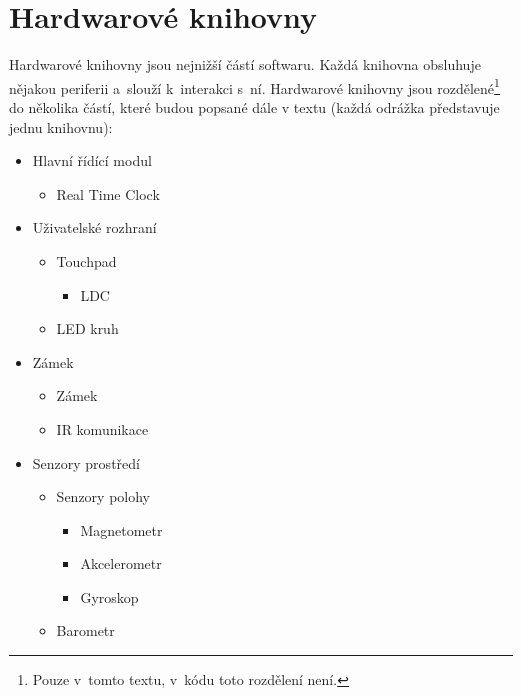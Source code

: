 \chapter{Hardwarové knihovny}
Hardwarové knihovny jsou nejnižší částí softwaru.
Každá knihovna obsluhuje nějakou periferii a~slouží k~interakci s~ní.
Hardwarové knihovny jsou rozdělené\footnote{Pouze v~tomto textu, v~kódu toto rozdělení není.} do několika částí, které budou popsané dále v textu (každá odrážka představuje jednu knihovnu):

\begin{itemize}[noitemsep]
    \item Hlavní řídící modul
          \begin{itemize}[noitemsep]
              \item Real Time Clock
          \end{itemize}
    \item Uživatelské rozhraní
          \begin{itemize}[noitemsep]
              \item Touchpad
                    \begin{itemize}[noitemsep]
                        \item LDC
                    \end{itemize}
              \item LED kruh
          \end{itemize}
    \item Zámek
          \begin{itemize}[noitemsep]
              \item Zámek
              \item IR komunikace
          \end{itemize}
    \item Senzory prostředí
          \begin{itemize}[noitemsep]
              \item Senzory polohy
                    \begin{itemize}[noitemsep]
                        \item Magnetometr
                        \item Akcelerometr
                        \item Gyroskop
                    \end{itemize}
              \item Barometr
          \end{itemize}
\end{itemize}


